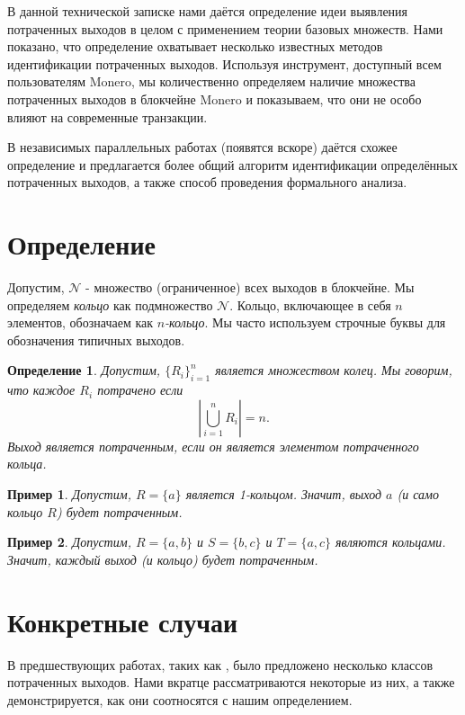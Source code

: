 \documentclass{mrl}
\newtheorem{defn}{Определение}
\newtheorem{example}{Пример}
\begin{document}
В данной технической записке нами даётся определение идеи выявления потраченных выходов в целом с применением теории базовых множеств. Нами показано, что определение охватывает несколько известных методов идентификации потраченных выходов. Используя инструмент, доступный всем пользователям Monero, мы количественно определяем наличие множества потраченных выходов в блокчейне Monero и показываем, что они не особо влияют на современные транзакции.

В независимых параллельных работах \cite{unpub1,unpub2} (появятся вскоре) даётся схожее определение и предлагается более общий алгоритм идентификации определённых потраченных выходов, а также способ проведения формального анализа.

\section{Определение}
Допустим, $\mathcal{N}$ - множество (ограниченное) всех выходов в блокчейне. Мы определяем \textit{кольцо} как подмножество $\mathcal{N}$. Кольцо, включающее в себя $n$ элементов, обозначаем как $n$\textit{-кольцо}. Мы часто используем строчные буквы для обозначения типичных выходов.

\begin{defn}
Допустим, $\{R_i\}_{i=1}^n$ является множеством колец. Мы говорим, что каждое $R_i$ \textit{потрачено} если $$\left| \bigcup_{i=1}^n R_i \right| = n.$$ Выход является \textit{потраченным}, если он является элементом потраченного кольца.
\end{defn}

\begin{example}
Допустим, $R = \{a\}$ является 1-кольцом. Значит, выход $a$ (и само кольцо $R$) будет потраченным.
\end{example}

\begin{example}
Допустим, $R = \{a,b\}$ и $S = \{b,c\}$ и $T = \{a,c\}$ являются кольцами. Значит, каждый выход (и кольцо) будет потраченным.
\end{example}

\section{Конкретные случаи}
В предшествующих работах, таких как \cite{mrl0001,mrl0004,kumar,moser,wijaya}, было предложено несколько классов потраченных выходов. Нами вкратце рассматриваются некоторые из них, а также демонстрируется, как они соотносятся с нашим определением.
\end{document}
